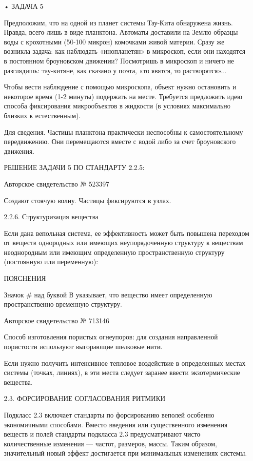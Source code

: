 • ЗАДАЧА 5

Предположим, что на одной из планет системы Тау-Кита обнаружена жизнь.
Правда,  всего лишь  в  виде планктона.  Автоматы  доставили на  Землю
образцы  воды с  крохотными (50-100  микрон) комочками  живой материи.
Сразу  же возникла  задача: как  наблюдать «инопланетян»  в микроскоп,
если  они находятся  в постоянном  броуновском движении?  Посмотришь в
микроскоп и ничего не разглядишь: тау-китяне, как сказано у поэта, «то
явятся, то растворятся»...

Чтобы вести наблюдение с помощью микроскопа, объект нужно остановить и
некоторое время (1-2 минуты)  подержать на месте. Требуется предложить
идею  способа  фиксирования  микрообъектов   в  жидкости  (в  условиях
максимально близких к естественным).

Для   сведения.    Частицы   планктона   практически    неспособны   к
самостоятельному передвижению. Они перемещаются вместе с водой либо за
счет броуновского движения.


РЕШЕНИЕ ЗАДАЧИ 5 ПО СТАНДАРТУ 2.2.5:


Авторское свидетельство № 523397

Создают стоячую волну. Частицы фиксируются в узлах.

2.2.6. Структуризация вещества

Если  дана вепольная  система,  ее эффективность  может быть  повышена
переходом от веществ однородных  или имеющих неупорядоченную структуру
к  веществам неоднородным  или  имеющим определенную  пространственную
структуру (постоянную или переменную):


ПОЯСНЕНИЯ

Значок  # над  буквой  В указывает,  что  вещество имеет  определенную
пространственно-временную структуру.


Авторское свидетельство № 713146

Способ  изготовления пористых  огнеупоров:  для создания  направленной
пористости используют выгорающие шелковые нити.

Если нужно  получить интенсивное  тепловое воздействие  в определенных
местах системы  (точках, линиях), в  эти места следует  заранее ввести
экзотермические вещества.


2.3. ФОРСИРОВАНИЕ СОГЛАСОВАНИЯ РИТМИКИ

Подкласс  2.3  включает  стандарты по  форсированию  веполей  особенно
экономичными  способами. Вместо  введения или  существенного изменения
веществ  и   полей  стандарты  подкласса  2.3   предусматривают  чисто
количественные  изменения —  частот, размеров,  массы. Таким  образом,
значительный  новый  эффект  достигается  при  минимальных  изменениях
системы.


